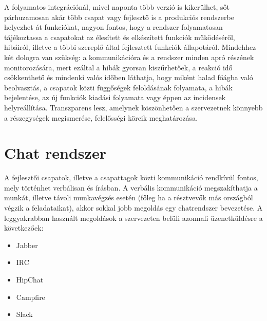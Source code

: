 A folyamatos integrációnál, mivel naponta több verzió is kikerülhet, sőt párhuzamosan akár több csapat vagy fejlesztő is a produkciós rendszerbe helyezhet át funkciókat, nagyon fontos, hogy a rendszer folyamatosan tájékoztassa a csapatokat az élesített és elkészített funkciók működéséről, hibáiról, illetve a többi szereplő által fejlesztett funkciók állapotáról. Mindehhez két dologra van szükség: a kommunikációra és a rendszer minden apró részének monitorozására, mert ezáltal a hibák gyorsan kiszűrhetőek, a reakció idő csökkenthető és mindenki valós időben láthatja, hogy miként halad főágba való beolvasztás, a csapatok közti függőségek feloldásának folyamata, a hibák bejelentése, az új funkciók kiadási folyamata vagy éppen az incidensek helyreállítása. Transzparens lesz, amelynek köszönhetően a szervezetnek könnyebb a részegységek megismerése, felelősségi köreik meghatározása.

\section{Chat rendszer}
A fejlesztői csapatok, illetve a csapattagok közti kommunikáció rendkívül fontos, mely történhet verbálisan és írásban. A verbális kommunikáció megszakíthatja a munkát, illetve távoli munkavégzés esetén (főleg ha a résztvevők más országból végzik a feladataikat), akkor sokkal jobb megoldás egy chatrendszer bevezetése. A leggyakrabban használt megoldások a szervezeten belüli azonnali üzenetküldésre a következőek:
\begin{itemize}
	\item Jabber
	\item IRC
	\item HipChat
	\item Campfire
	\item Slack
\end{itemize}

